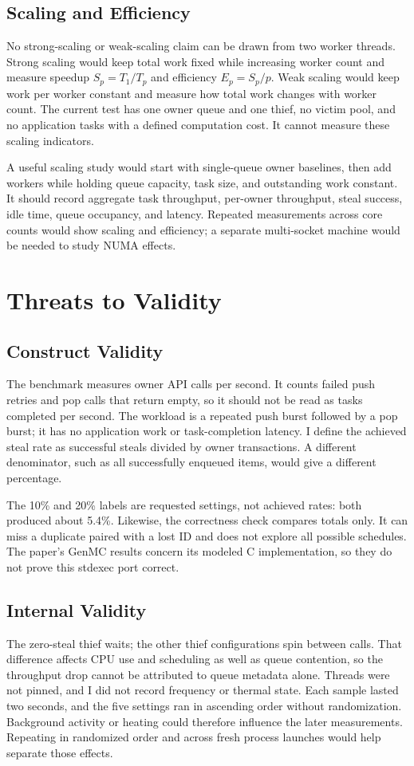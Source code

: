 \documentclass[conference]{IEEEtran}
\begin{document}
\subsection{Scaling and Efficiency}
No strong-scaling or weak-scaling claim can be drawn from two worker threads. Strong scaling would keep total work fixed while increasing worker count and measure speedup $S_p=T_1/T_p$ and efficiency $E_p=S_p/p$. Weak scaling would keep work per worker constant and measure how total work changes with worker count. The current test has one owner queue and one thief, no victim pool, and no application tasks with a defined computation cost. It cannot measure these scaling indicators.

A useful scaling study would start with single-queue owner baselines, then add workers while holding queue capacity, task size, and outstanding work constant. It should record aggregate task throughput, per-owner throughput, steal success, idle time, queue occupancy, and latency. Repeated measurements across core counts would show scaling and efficiency; a separate multi-socket machine would be needed to study NUMA effects.

\section{Threats to Validity}
\subsection{Construct Validity}
The benchmark measures owner API calls per second. It counts failed push retries and pop calls that return empty, so it should not be read as tasks completed per second. The workload is a repeated push burst followed by a pop burst; it has no application work or task-completion latency. I define the achieved steal rate as successful steals divided by owner transactions. A different denominator, such as all successfully enqueued items, would give a different percentage.

The 10\% and 20\% labels are requested settings, not achieved rates: both produced about 5.4\%. Likewise, the correctness check compares totals only. It can miss a duplicate paired with a lost ID and does not explore all possible schedules. The paper's GenMC results concern its modeled C implementation, so they do not prove this stdexec port correct.

\subsection{Internal Validity}
The zero-steal thief waits; the other thief configurations spin between calls. That difference affects CPU use and scheduling as well as queue contention, so the throughput drop cannot be attributed to queue metadata alone. Threads were not pinned, and I did not record frequency or thermal state. Each sample lasted two seconds, and the five settings ran in ascending order without randomization. Background activity or heating could therefore influence the later measurements. Repeating in randomized order and across fresh process launches would help separate those effects.
\end{document}
